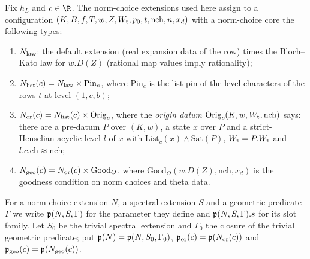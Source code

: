 \begin{definition}\label{pf:baselat2:ext}
Fix $h_L$ and $c\in\R$. The norm-choice extensions used here assign to a configuration
$(K,B,f,T,w,Z,W_{\mathrm{t}},p_0,t,\mathrm{nch},n,x_d)$ with a norm-choice core the following types:
\begin{enumerate}[label=(\alph*)]
\item $N_{\mathrm{law}}$: the default extension (real expansion data of the row) times the Bloch--Kato law
  for $w.D(Z)$ (rational map values imply rationality);
\item $N_{\mathrm{list}}(c)=N_{\mathrm{law}}\times\mathrm{Pin}_c$, where $\mathrm{Pin}_c$ is the list pin of the
  level characters of the rows $t$ at level $(1,c,b)$;
\item $N_{\mathrm{or}}(c)=N_{\mathrm{list}}(c)\times\mathrm{Orig}_c$, where the \emph{origin datum}
  $\mathrm{Orig}_c(K,w,W_{\mathrm{t}},\mathrm{nch})$ says: there are a pre-datum $P$ over $(K,w)$, a state $x$
  over $P$ and a strict-Henselian-acyclic level $l$ of $x$ with $\mathrm{List}_c(x)\wedge\mathrm{Sat}(P)$,
  $W_{\mathrm{t}}=P.W_{\mathrm{t}}$ and $l.c.\mathrm{ch}\approx\mathrm{nch}$;
\item $N_{\mathrm{geo}}(c)=N_{\mathrm{or}}(c)\times\mathrm{Good}_O$, where $\mathrm{Good}_O(w.D(Z),\mathrm{nch},x_d)$ is
  the goodness condition on norm choices and theta data.
\end{enumerate}
For a norm-choice extension $N$, a spectral extension $S$ and a geometric predicate $\Gamma$ we write
$\mathfrak{p}(N,S,\Gamma)$ for the parameter they define and $\mathfrak{p}(N,S,\Gamma).s$ for its slot family.
Let $S_0$ be the trivial spectral extension and $\Gamma_0$ the closure of the trivial geometric predicate;
put $\mathfrak{p}(N)=\mathfrak{p}(N,S_0,\Gamma_0)$, $\mathfrak{p}_{\mathrm{or}}(c)=\mathfrak{p}(N_{\mathrm{or}}(c))$ and
$\mathfrak{p}_{\mathrm{geo}}(c)=\mathfrak{p}(N_{\mathrm{geo}}(c))$.
\end{definition}

